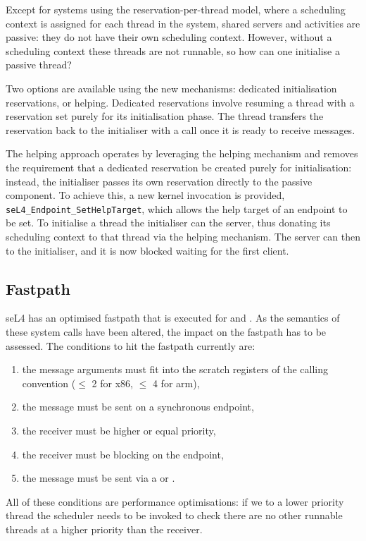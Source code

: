 Except for systems using the reservation-per-thread model, where a scheduling context is assigned for each thread in the system, shared servers and activities are passive: they do not have their own scheduling context.
However, without a scheduling context these threads are not runnable, so how can one initialise a passive thread?

Two options are available using the new mechanisms: dedicated initialisation reservations, or helping.
Dedicated reservations involve resuming a thread with a reservation set purely for its initialisation phase.
The thread transfers the reservation back to the initialiser with a \sendwait call once it is ready to receive messages.

The helping approach operates by leveraging the helping mechanism and removes the requirement that a dedicated reservation be created purely for initialisation: instead, the initialiser passes its own reservation directly to the passive component.
To achieve this, a new kernel invocation is provided, \texttt{seL4\_Endpoint\_SetHelpTarget}, which allows the help target of an endpoint to be set.
To initialise a thread the initialiser can \call the server, thus donating its scheduling context to that thread via the helping mechanism.
The server can then \replywait to the initialiser, and it is now blocked waiting for the first client.

\subsection{Fastpath}

seL4 has an optimised fastpath that is executed for \call and \replywait.
As the semantics of these system calls have been altered, the impact on the fastpath has to be assessed.
The conditions to hit the fastpath currently are:
\begin{enumerate}
    \item the message arguments must fit into the scratch registers of the calling convention ($\leq$ 2 for x86, $\leq$ 4 for arm),
    \item the message must be sent on a synchronous endpoint,
    \item the receiver must be higher or equal priority,
    \item the receiver must be blocking on the endpoint,
    \item the message must be sent via a \call or \replywait.
\end{enumerate}
All of these conditions are performance optimisations: if we \call to a lower priority thread the
scheduler needs to be invoked to check there are no other runnable threads at a higher priority than the receiver.

